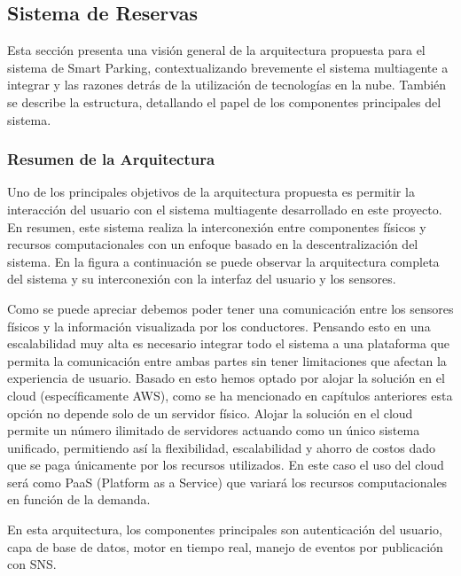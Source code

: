 \clearpage

\subsection{Sistema de Reservas}
Esta sección presenta una visión general de la arquitectura propuesta para el sistema de Smart Parking, contextualizando brevemente el sistema multiagente a integrar y las razones detrás de la utilización de tecnologías en la nube. También se describe la estructura, detallando el papel de los componentes principales del sistema.

\subsubsection{Resumen de la Arquitectura}

Uno de los principales objetivos de la arquitectura propuesta es permitir la interacción del usuario con el sistema multiagente desarrollado en este proyecto. En resumen, este sistema realiza la interconexión entre componentes físicos y recursos computacionales con un enfoque basado en la descentralización del sistema. En la figura a continuación se puede observar la arquitectura completa del sistema y su interconexión con la interfaz del usuario y los sensores.


Como se puede apreciar debemos poder tener una comunicación entre los sensores físicos y la información visualizada por los conductores. Pensando esto en una escalabilidad muy alta es necesario integrar todo el sistema a una plataforma que permita la comunicación entre ambas partes sin tener limitaciones que afectan la experiencia de usuario. Basado en esto hemos optado por alojar la solución en el cloud (específicamente AWS), como se ha mencionado en capítulos anteriores esta opción no depende solo de un servidor físico. Alojar la solución en el cloud permite un número ilimitado de servidores actuando como un único sistema unificado, permitiendo así la flexibilidad, escalabilidad y ahorro de costos dado que se paga únicamente por los recursos utilizados. En este caso el uso del cloud será como PaaS (Platform as a Service) que variará los recursos computacionales en función de la demanda.

En esta arquitectura, los componentes principales son autenticación del usuario, capa de base de datos, motor en tiempo real, manejo de eventos por publicación con SNS.

